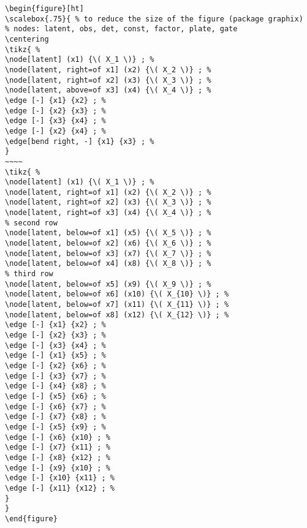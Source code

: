 \documentclass[a4paper]{article}
\begin{document}
\lstset{numbers=left,language=[LaTeX]TeX,label= ,caption= ,captionpos=b}
\begin{lstlisting}
\begin{figure}[ht]
\scalebox{.75}{ % to reduce the size of the figure (package graphix)
% nodes: latent, obs, det, const, factor, plate, gate
\centering
\tikz{ %
\node[latent] (x1) {\( X_1 \)} ; %
\node[latent, right=of x1] (x2) {\( X_2 \)} ; %
\node[latent, right=of x2] (x3) {\( X_3 \)} ; %
\node[latent, above=of x3] (x4) {\( X_4 \)} ; %
\edge [-] {x1} {x2} ; %
\edge [-] {x2} {x3} ; %
\edge [-] {x3} {x4} ; %
\edge [-] {x2} {x4} ; %
\edge[bend right, -] {x1} {x3} ; %
}
~~~~
\tikz{ %
\node[latent] (x1) {\( X_1 \)} ; %
\node[latent, right=of x1] (x2) {\( X_2 \)} ; %
\node[latent, right=of x2] (x3) {\( X_3 \)} ; %
\node[latent, right=of x3] (x4) {\( X_4 \)} ; %
% second row
\node[latent, below=of x1] (x5) {\( X_5 \)} ; %
\node[latent, below=of x2] (x6) {\( X_6 \)} ; %
\node[latent, below=of x3] (x7) {\( X_7 \)} ; %
\node[latent, below=of x4] (x8) {\( X_8 \)} ; %
% third row
\node[latent, below=of x5] (x9) {\( X_9 \)} ; %
\node[latent, below=of x6] (x10) {\( X_{10} \)} ; %
\node[latent, below=of x7] (x11) {\( X_{11} \)} ; %
\node[latent, below=of x8] (x12) {\( X_{12} \)} ; %
\edge [-] {x1} {x2} ; %
\edge [-] {x2} {x3} ; %
\edge [-] {x3} {x4} ; %
\edge [-] {x1} {x5} ; %
\edge [-] {x2} {x6} ; %
\edge [-] {x3} {x7} ; %
\edge [-] {x4} {x8} ; %
\edge [-] {x5} {x6} ; %
\edge [-] {x6} {x7} ; %
\edge [-] {x7} {x8} ; %
\edge [-] {x5} {x9} ; %
\edge [-] {x6} {x10} ; %
\edge [-] {x7} {x11} ; %
\edge [-] {x8} {x12} ; %
\edge [-] {x9} {x10} ; %
\edge [-] {x10} {x11} ; %
\edge [-] {x11} {x12} ; %
}
}
\end{figure}
\end{lstlisting}
\end{document}
